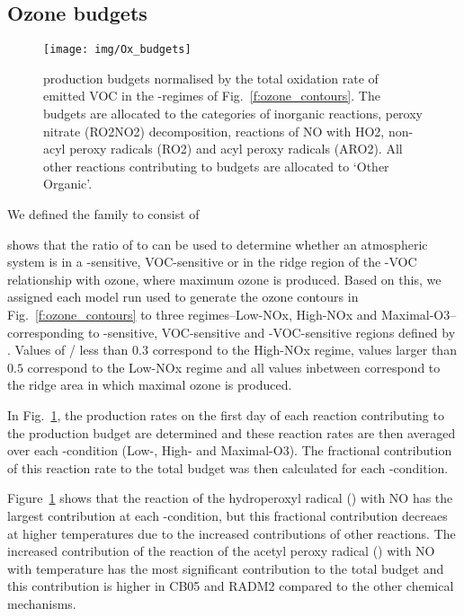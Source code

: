 \subsection{Ozone budgets} \label{ss:r_budgets}

\begin{figure}%
    \centering%
    \caption{ production budgets normalised by the total oxidation rate of emitted VOC in the -regimes of Fig.~\ref{f:ozone_contours}. The budgets are allocated to the categories of inorganic reactions, peroxy nitrate (RO2NO2) decomposition, reactions of NO with HO2, non-acyl peroxy radicals (RO2) and acyl peroxy radicals (ARO2). All other reactions contributing to  budgets are allocated to `Other Organic'.}%
    \label{f:ozone_budgets}%
    \texttt{[image: img/Ox\_budgets]}
\end{figure}

We defined the  family to consist of 

\citet{Sillman:1995} shows that the ratio of  to  can be used to determine whether an atmospheric system is in a -sensitive, VOC-sensitive or in the ridge region of the -VOC relationship with ozone, where maximum ozone is produced.
Based on this, we assigned each model run used to generate the ozone contours in Fig.~\ref{f:ozone_contours} to three  regimes--Low-NOx, High-NOx and Maximal-O3--corresponding to -sensitive, VOC-sensitive and -VOC-sensitive regions defined by \citet{Sillman:1995}.
Values of / less than $0.3$ correspond to the High-NOx regime, values larger than $0.5$ correspond to the Low-NOx regime and all values inbetween correspond to the ridge area in which maximal ozone is produced.

In Fig.~\ref{f:ozone_budgets}, the production rates on the first day of each reaction contributing to the  production budget are determined and these reaction rates are then averaged over each -condition (Low-, High- and Maximal-O3).
The fractional contribution of this reaction rate to the total  budget was then calculated for each -condition.

Figure~\ref{f:ozone_budgets} shows that the reaction of the hydroperoxyl radical () with NO has the largest contribution at each -condition, but this fractional contribution decreaes at higher temperatures due to the increased contributions of other reactions.
The increased contribution of the reaction of the acetyl peroxy radical () with NO with temperature has the most significant contribution to the total  budget and this contribution is higher in CB05 and RADM2 compared to the other chemical mechanisms.

